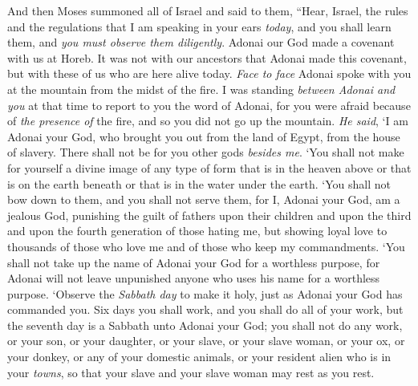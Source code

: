 \begin{biblechapter} %
 And then Moses summoned all of Israel and said to them, “Hear, Israel, the rules and the regulations that I am speaking in your ears \textit{today}, and you shall learn them, and \textit{you must observe them diligently}.
\verse Adonai our God made a covenant with us at Horeb.
\verse It was not with our ancestors that Adonai made this covenant, but with these of us who are here alive today.
\verse \textit{Face to face} Adonai spoke with you at the mountain from the midst of the fire.
\verse I was standing \textit{between Adonai and you} at that time to report to you the word of Adonai, for you were afraid because of \textit{the presence of} the fire, and so you did not go up the mountain. \textit{He said},
\verse ‘I am Adonai your God, who brought you out from the land of Egypt, from the house of slavery.
\verse There shall not be for you other gods \textit{besides me}.
\verse ‘You shall not make for yourself a divine image of any type of form that is in the heaven above or that is on the earth beneath or that is in the water under the earth.
\verse ‘You shall not bow down to them, and you shall not serve them, for I, Adonai your God, am a jealous God, punishing the guilt of fathers upon their children and upon the third and upon the fourth generation of those hating me,
\verse but showing loyal love to thousands of those who love me and of those who keep my commandments.
\verse ‘You shall not take up the name of Adonai your God for a worthless purpose, for Adonai will not leave unpunished anyone who uses his name for a worthless purpose.
\verse ‘Observe the \textit{Sabbath day} to make it holy, just as Adonai your God has commanded you.
\verse Six days you shall work, and you shall do all of your work,
\verse but the seventh day is a Sabbath unto Adonai your God; you shall not do any work, or your son, or your daughter, or your slave, or your slave woman, or your ox, or your donkey, or any of your domestic animals, or your resident alien who is in your \textit{towns}, so that your slave and your slave woman may rest as you rest.

\end{biblechapter}

